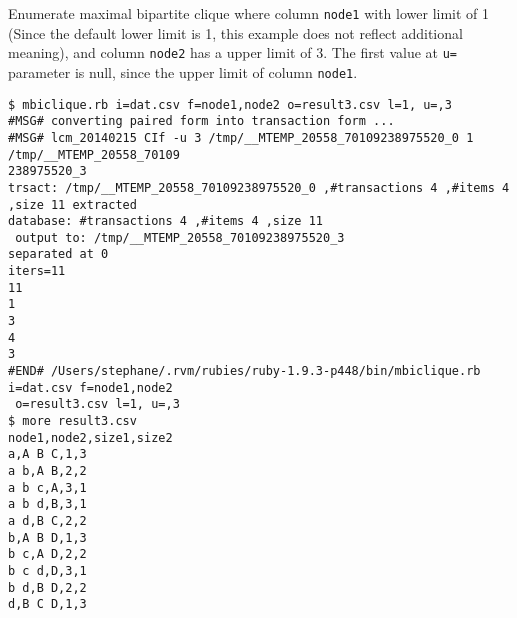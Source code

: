 Enumerate maximal bipartite clique where column \verb|node1| with lower limit of 1 (Since the default lower limit is 1, this example does not reflect additional meaning),
and column \verb|node2| has a upper limit of 3.
The first value at \verb|u=| parameter is null, since the upper limit of column \verb|node1|. 


\begin{Verbatim}[baselinestretch=0.7,frame=single]
$ mbiclique.rb i=dat.csv f=node1,node2 o=result3.csv l=1, u=,3
#MSG# converting paired form into transaction form ...
#MSG# lcm_20140215 CIf -u 3 /tmp/__MTEMP_20558_70109238975520_0 1 /tmp/__MTEMP_20558_70109
238975520_3
trsact: /tmp/__MTEMP_20558_70109238975520_0 ,#transactions 4 ,#items 4 ,size 11 extracted 
database: #transactions 4 ,#items 4 ,size 11
 output to: /tmp/__MTEMP_20558_70109238975520_3
separated at 0
iters=11
11
1
3
4
3
#END# /Users/stephane/.rvm/rubies/ruby-1.9.3-p448/bin/mbiclique.rb i=dat.csv f=node1,node2
 o=result3.csv l=1, u=,3
$ more result3.csv
node1,node2,size1,size2
a,A B C,1,3
a b,A B,2,2
a b c,A,3,1
a b d,B,3,1
a d,B C,2,2
b,A B D,1,3
b c,A D,2,2
b c d,D,3,1
b d,B D,2,2
d,B C D,1,3
\end{Verbatim}

